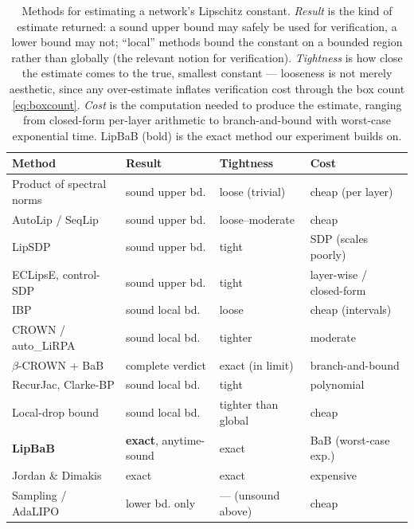 \begin{table}[htbp]
\centering
\small
\begin{tabular}{p{4.4cm}llp{2.3cm}}
\hline
\textbf{Method} & \textbf{Result} & \textbf{Tightness} & \textbf{Cost} \\
\hline
Product of spectral norms & sound upper bd. & loose (trivial) & cheap (per layer) \\
AutoLip / SeqLip \cite{virmaux2018lipschitz} & sound upper bd. & loose--moderate & cheap \\
LipSDP \cite{fazlyab2019lipsdp} & sound upper bd. & tight & SDP (scales poorly) \\
ECLipsE, control-SDP \cite{xu2024eclipse,pauli2024controltools} & sound upper bd. & tight & layer-wise / closed-form \\
IBP \cite{gowal2018ibp} & sound local bd. & loose & cheap (intervals) \\
CROWN / auto\_LiRPA \cite{zhang2018crown,xu2020autolirpa} & sound local bd. & tighter & moderate \\
$\beta$-CROWN + BaB \cite{wang2021betacrown} & complete verdict & exact (in limit) & branch-and-bound \\
RecurJac, Clarke-BP \cite{zhang2019recurjac,shi2022efficiently} & sound local bd. & tight & polynomial \\
Local-drop bound \cite{huang2021training} & sound local bd. & tighter than global & cheap \\
\textbf{LipBaB} \cite{bhowmick2021lipbab} & \textbf{exact}, anytime-sound & exact & BaB (worst-case exp.) \\
Jordan \& Dimakis \cite{jordan2020exactly} & exact & exact & expensive \\
Sampling / AdaLIPO \cite{malherbe2017global} & lower bd. only & --- (unsound above) & cheap \\
\hline
\end{tabular}
\caption{Methods for estimating a network's Lipschitz constant.
\emph{Result} is the kind of estimate returned: a sound upper bound may safely
be used for verification, a lower bound may not; ``local'' methods bound the
constant on a bounded region rather than globally (the relevant notion for
verification). \emph{Tightness} is how close the estimate comes to the true,
smallest constant --- looseness is not merely aesthetic, since any
over-estimate inflates verification cost through the box count
\eqref{eq:boxcount}. \emph{Cost} is the computation needed to produce the
estimate, ranging from closed-form per-layer arithmetic to branch-and-bound
with worst-case exponential time. LipBaB (bold) is the exact method our
experiment builds on.}
\label{tab:methods}
\end{table}

